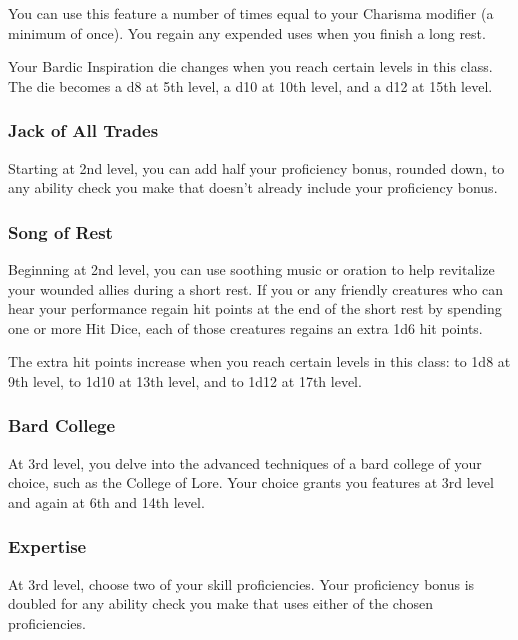 \documentclass[
]{article}
\begin{document}
You can use this feature a number of times equal to your Charisma
modifier (a minimum of once). You regain any expended uses when you
finish a long rest.

Your Bardic Inspiration die changes when you reach certain levels in
this class. The die becomes a d8 at 5th level, a d10 at 10th level, and
a d12 at 15th level.

\hypertarget{jack-of-all-trades}{%
\subsubsection{Jack of All Trades}\label{jack-of-all-trades}}

Starting at 2nd level, you can add half your proficiency bonus, rounded
down, to any ability check you make that doesn't already include your
proficiency bonus.

\hypertarget{song-of-rest}{%
\subsubsection{Song of Rest}\label{song-of-rest}}

Beginning at 2nd level, you can use soothing music or oration to help
revitalize your wounded allies during a short rest. If you or any
friendly creatures who can hear your performance regain hit points at
the end of the short rest by spending one or more Hit Dice, each of
those creatures regains an extra 1d6 hit points.

The extra hit points increase when you reach certain levels in this
class: to 1d8 at 9th level, to 1d10 at 13th level, and to 1d12 at 17th
level.

\hypertarget{bard-college}{%
\subsubsection{Bard College}\label{bard-college}}

At 3rd level, you delve into the advanced techniques of a bard college
of your choice, such as the College of Lore. Your choice grants you
features at 3rd level and again at 6th and 14th level.

\hypertarget{expertise}{%
\subsubsection{Expertise}\label{expertise}}

At 3rd level, choose two of your skill proficiencies. Your proficiency
bonus is doubled for any ability check you make that uses either of the
chosen proficiencies.
\end{document}
